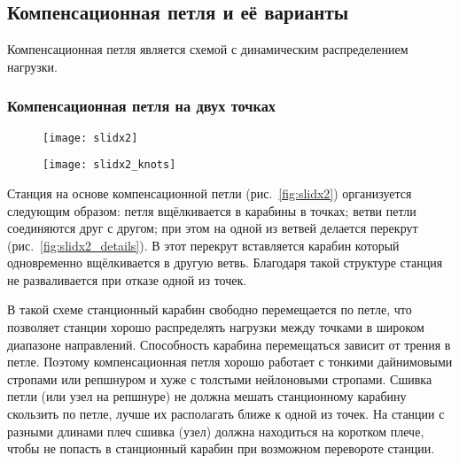 \documentclass[fleqn, 12pt]{extarticle}
\begin{document}
\subsection{Компенсационная петля и её варианты}
    Компенсационная петля является схемой с динамическим распределением нагрузки.
    
    \subsubsection{Компенсационная петля на двух точках}
    \begin{figure}[h]
        \centering
        \begin{minipage}[t]{0.45\textwidth}
            \texttt{[image: slidx2]}
            \label{fig:slidx2}
        \end{minipage}\hspace{0.05\textwidth}
        \begin{minipage}[t]{0.45\textwidth}
            \texttt{[image: slidx2\_knots]}
            \label{fig:slidx2_knots}
        \end{minipage}
    \end{figure}
    
    Станция на основе компенсационной петли (рис.~\ref{fig:slidx2}) организуется следующим образом: петля вщёлкивается в карабины в точках; ветви петли соединяются друг с другом;
    при этом на одной из ветвей делается перекрут (рис.~\ref{fig:slidx2_details}). В этот перекрут вставляется карабин который одновременно вщёлкивается в другую ветвь.
    Благодаря такой структуре станция не разваливается при отказе одной из точек. 
    
    В такой схеме станционный карабин свободно перемещается по петле, что позволяет станции хорошо распределять
    нагрузки между точками в широком диапазоне направлений.
    Способность карабина перемещаться зависит от трения в петле. Поэтому компенсационная петля хорошо работает с тонкими дайнимовыми стропами или репшнуром и хуже
    с толстыми нейлоновыми стропами. Сшивка петли (или узел на репшнуре) не должна мешать станционному карабину скользить по петле, лучше их располагать ближе к одной из точек.
    На станции с разными длинами плеч сшивка (узел) должна находиться на коротком плече, чтобы не попасть в станционный карабин при возможном перевороте станции.
    
\end{document}
